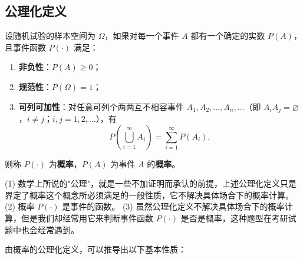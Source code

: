 ﻿\documentclass[lang=cn,11pt]{elegantbook}
\begin{document}
\subsection*{公理化定义}

\begin{definition}[概率的公理化定义] \label{def:probability-axiom}
设随机试验的样本空间为 \(\Omega\)，如果对每一个事件 \(A\) 都有一个确定的实数 \(P(A)\)，且事件函数 \(P(\cdot)\) 满足：
\begin{enumerate}
    \item \textbf{非负性}：\(P(A) \ge 0\)；
    \item \textbf{规范性}：\(P(\Omega) = 1\)；
    \item \textbf{可列可加性}：对任意可列个两两互不相容事件 \(A_1, A_2, \dots, A_n, \dots\)（即 \(A_i A_j = \varnothing\)，\(i \neq j\)；\(i, j = 1, 2, \dots\)），有
    \[
    P\!\left(\bigcup_{i=1}^{\infty} A_i\right) = \sum_{i=1}^{\infty} P(A_i),
    \]
\end{enumerate}
则称 \(P(\cdot)\) 为\textbf{概率}，\(P(A)\) 为事件 \(A\) 的\textbf{概率}。
\end{definition}

\begin{remark}
(1) 数学上所说的"公理"，就是一些不加证明而承认的前提，上述公理化定义只是界定了概率这个概念所必须满足的一般性质，它不解决具体场合下的概率计算。\newline
(2) 概率 \(P(\cdot)\) 是事件的函数。\newline
(3) 虽然公理化定义不解决具体场合下的概率计算，但是我们却经常用它来判断事件函数 \(P(\cdot)\) 是否是概率，这种题型在考研试题中也会经常遇到。
\end{remark}

由概率的公理化定义，可以推导出以下基本性质：
\end{document}
